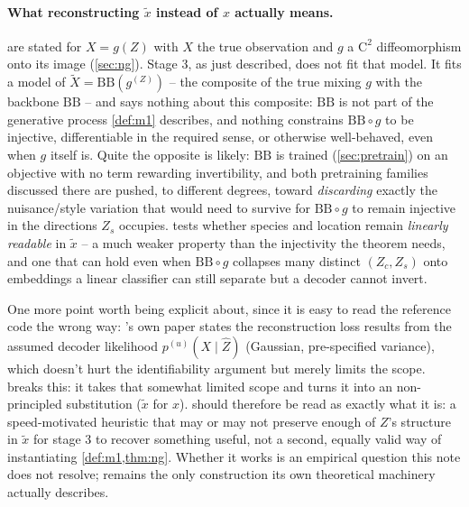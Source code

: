 \paragraph{What reconstructing $\tilde x$ instead of $x$ actually means.}
\label{sec:archB:gap}
 are stated for $X=g(Z)$ with $X$ the true observation and $g$ a $\mathrm{C}^2$
diffeomorphism onto its image (\cref{sec:ng}). Stage 3, as just described, does not fit that model. It
fits a model of $\tilde X=\mathrm{BB}(g^(Z))$ -- the composite of the true mixing $g$ with the 
backbone $\mathrm{BB}$ -- and \cite{ng2025} says nothing about this composite: $\mathrm{BB}$ is not part 
of the generative process \cref{def:m1} describes, and nothing constrains $\mathrm{BB}\circ g$ 
to be injective, differentiable in the required sense, or otherwise well-behaved, even when $g$ itself 
is.
Quite the opposite is likely: $\mathrm{BB}$ is trained (\cref{sec:pretrain}) on an objective with no
term rewarding invertibility, and both pretraining families discussed there are pushed, to different
degrees, toward \emph{discarding} exactly the nuisance/style variation that would need to survive for
$\mathrm{BB}\circ g$ to remain injective in the directions $Z_s$ occupies.  tests
whether species and location remain \emph{linearly readable} in $\tilde x$ -- a much weaker property
than the injectivity the theorem needs, and one that can hold even when $\mathrm{BB}\circ g$ 
collapses many distinct $(Z_c,Z_s)$ onto embeddings a linear classifier can still separate but a decoder 
cannot invert.

One more point worth being explicit about, since it is easy to read the reference code the wrong way:
\cite{ng2025}'s own paper states the reconstruction loss results from the assumed 
decoder likelihood $p^{(u)}(X \mid \hat Z)$ (Gaussian, pre-specified variance), which 
doesn't hurt the identifiability argument but merely limits the scope.  breaks this: 
it takes that somewhat limited scope and turns it into an non-principled substitution ($\tilde x$ for 
$x$). 
 should therefore be read as exactly what it is: a speed-motivated heuristic that may 
or may not preserve enough of $Z$'s structure in $\tilde x$ for stage 3 to recover something useful, not 
a second, equally valid way of instantiating \cref{def:m1,thm:ng}. Whether it works is an empirical 
question this note does not resolve;  remains the only construction its own 
theoretical machinery actually describes.

